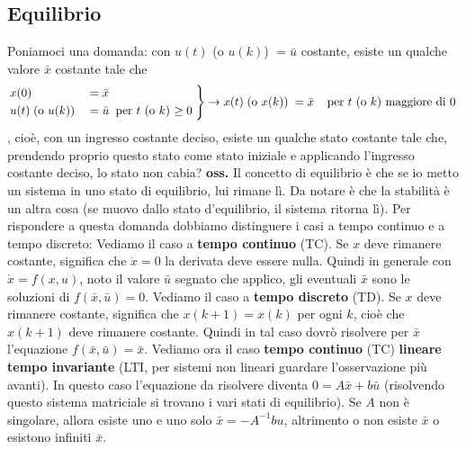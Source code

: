 \subsection{Equilibrio}
Poniamoci una domanda: con $u(t)$ (o $u(k)$) $=\bar{u}$ costante, esiste un qualche valore $\bar{x}$ costante tale che 
\[
    \begin{rcases}
        x(0) &= \bar{x}\\
        u(t) \;\text{(o $u(k)$)}\; &= \bar{u} \;\;\text{per $t$ (o $k$) $\geq 0$}\;
    \end{rcases} \rightarrow x(t) \;\text{(o $x(k)$)}\; = \bar{x} \;\;\;\;\text{per $t$ (o $k$) maggiore di 0}\;
\]
, cioè, con un ingresso costante deciso, esiste un qualche stato costante tale che, prendendo proprio questo stato come stato iniziale e applicando l'ingresso costante deciso, lo stato non cabia?\newline
\newline
\textbf{oss.} Il concetto di equilibrio è che se io metto un sistema in uno stato di equilibrio, lui rimane lì. Da notare è che la stabilità è un altra cosa (se muovo dallo stato d'equilibrio, il sistema ritorna lì).\newline
\newline
Per rispondere a questa domanda dobbiamo distinguere i casi a tempo continuo e a tempo discreto:\newline
\newline
Vediamo il caso a \textbf{tempo continuo} (TC). Se $x$ deve rimanere costante, significa che $\dot{x} = 0$ la derivata deve essere nulla. Quindi in generale con $\dot{x} = f(x,u)$, noto il valore $\bar{u}$ segnato che applico, gli eventuali $\bar{x}$ sono le soluzioni di $f(\bar{x}, \bar{u}) = 0$.\newline
\newline
Vediamo il caso a \textbf{tempo discreto} (TD). Se $x$ deve rimanere costante, significa che $x(k+1) = x(k)$ per ogni $k$, cioè che $x(k+1)$ deve rimanere costante. Quindi in tal caso dovrò risolvere per $\bar{x}$ l'equazione $f(\bar{x}, \bar{u}) = \bar{x}$.\newline
\newline
Vediamo ora il caso \textbf{tempo continuo} (TC) \textbf{lineare tempo invariante} (LTI, per sistemi non lineari guardare l'osservazione più avanti). In questo caso l'equazione da risolvere diventa $0 = A \bar{x} + b \bar{u}$ (risolvendo questo sistema matriciale si trovano i vari stati di equilibrio). Se $A$ non è singolare, allora esiste uno e uno solo $\bar{x} = -A^{-1} b u$, altrimento o non esiste $\bar{x}$ o esistono infiniti $\bar{x}$.\newline
